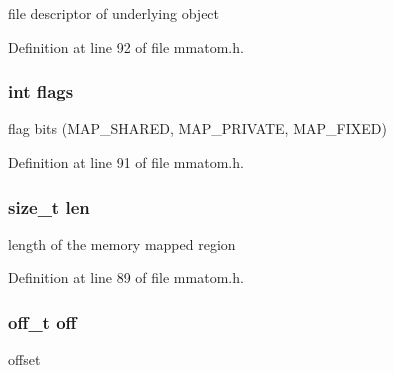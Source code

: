 file descriptor of underlying object 



Definition at line 92 of file mmatom.\-h.

\hypertarget{struct_m_m_a___m_e_m_m_a_p___r_e_f_ac8bf36fe0577cba66bccda3a6f7e80a4}{
\subsubsection[{flags}]{\setlength{\rightskip}{0pt plus 5cm}int flags}}\label{struct_m_m_a___m_e_m_m_a_p___r_e_f_ac8bf36fe0577cba66bccda3a6f7e80a4}


flag bits (M\-A\-P\-\_\-\-S\-H\-A\-R\-E\-D, M\-A\-P\-\_\-\-P\-R\-I\-V\-A\-T\-E, M\-A\-P\-\_\-\-F\-I\-X\-E\-D) 



Definition at line 91 of file mmatom.\-h.

\hypertarget{struct_m_m_a___m_e_m_m_a_p___r_e_f_a7360b55975153b822efc5217b7734e6a}{
\subsubsection[{len}]{\setlength{\rightskip}{0pt plus 5cm}size\-\_\-t len}}\label{struct_m_m_a___m_e_m_m_a_p___r_e_f_a7360b55975153b822efc5217b7734e6a}


length of the memory mapped region 



Definition at line 89 of file mmatom.\-h.

\hypertarget{struct_m_m_a___m_e_m_m_a_p___r_e_f_ae55cdc1a5c5d6998036cdc48050636a9}{
\subsubsection[{off}]{\setlength{\rightskip}{0pt plus 5cm}off\-\_\-t off}}\label{struct_m_m_a___m_e_m_m_a_p___r_e_f_ae55cdc1a5c5d6998036cdc48050636a9}


offset 



